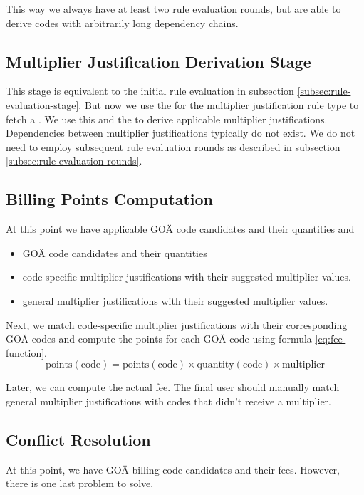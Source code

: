 This way we always have at least two rule evaluation rounds,
but are able to derive codes with arbitrarily long  dependency chains.

\subsection{Multiplier Justification Derivation Stage}\label{subsec:multiplier-justification-derivation-stage}
This stage is equivalent to the initial rule evaluation in subsection \ref{subsec:rule-evaluation-stage}.
But now we use the \REIF for the multiplier justification rule type to fetch a \REI.
We use this \REI and the  to derive applicable multiplier justifications.
Dependencies between multiplier justifications typically do not exist.
We do not need to employ subsequent rule evaluation rounds as described in subsection \ref{subsec:rule-evaluation-rounds}.

\subsection{Billing Points Computation}\label{subsec:fee-computation}
At this point we have applicable GOÄ code candidates and their quantities and
\begin{itemize}
    \item GOÄ code candidates and their quantities
    \item code-specific multiplier justifications with their suggested multiplier values.
    \item general multiplier justifications with their suggested multiplier values.
\end{itemize}
Next, we match code-specific multiplier justifications with their corresponding GOÄ codes and compute the points for each GOÄ code using formula \ref{eq:fee-function}.
\begin{equation}\label{eq:fee-function}
    \text{points}\left(\text{code}\right) = \text{points}\left(\text{code}\right) \times \text{quantity}\left(\text{code}\right) \times \text{multiplier}
\end{equation}

Later, we can compute the actual fee.
The final user should manually match general multiplier justifications with codes that didn't receive a multiplier.


\subsection{Conflict Resolution}\label{subsec:conflict-resolution}
At this point, we have GOÄ billing code candidates and their fees.
However, there is one last problem to solve.


